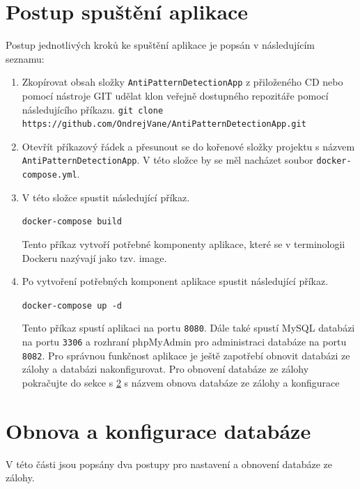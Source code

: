 \documentclass[czech,DP]{thesiskiv}
\begin{document}
\section{Postup spuštění aplikace}
Postup jednotlivých kroků ke spuštění aplikace je popsán v následujícím seznamu: 
\begin{enumerate}
    \item Zkopírovat obsah složky \texttt{AntiPatternDetectionApp} z přiloženého CD nebo pomocí nástroje GIT udělat klon veřejně dostupného repozitáře pomocí následujícího příkazu.
    \newline
    \newline
    \verb|git clone https://github.com/OndrejVane/AntiPatternDetectionApp.git|
    
    \item Otevřít příkazový řádek a přesunout se do kořenové složky projektu s názvem \texttt{AntiPatternDetectionApp}. V této složce by se měl nacházet soubor \texttt{docker-compose.yml}.
    \item V této složce spustit následující příkaz.
    \begin{center}
    \verb|docker-compose build|    
    \end{center}
    Tento příkaz vytvoří potřebné komponenty aplikace, které se v terminologii Dockeru nazývají jako tzv. image.
    \item Po vytvoření potřebných komponent aplikace spustit následující příkaz. \begin{center}
    \verb|docker-compose up -d|    
    \end{center}
    Tento příkaz spustí aplikaci na portu \texttt{8080}. Dále také spustí MySQL databázi na portu \texttt{3306} a rozhraní phpMyAdmin pro administraci databáze na portu \texttt{8082}. Pro správnou funkčnost aplikace je ještě zapotřebí obnovit databázi ze zálohy a databázi nakonfigurovat. Pro obnovení databáze ze zálohy pokračujte do sekce s \ref{section:db_restore} s názvem obnova databáze ze zálohy a konfigurace
\end{enumerate}
\section{Obnova a konfigurace databáze}\label{section:db_restore}
V této části jsou popsány dva postupy pro nastavení a obnovení databáze ze zálohy.
\end{document}
